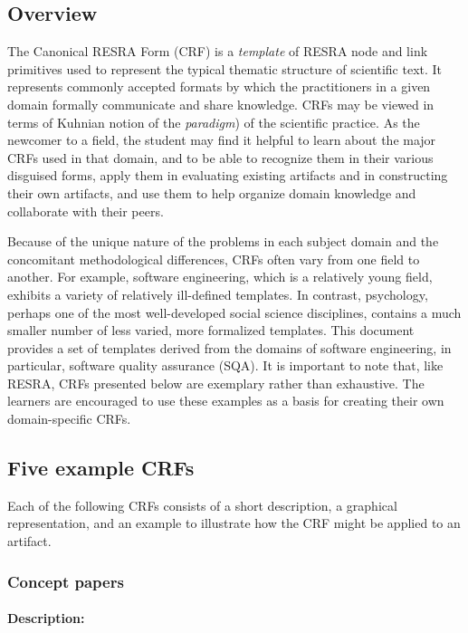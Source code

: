 \begin{itemize}
{\subsection{Overview}

The Canonical RESRA Form (CRF) is a {\it template\/} of RESRA node and link
primitives used to represent the typical thematic structure of scientific
text.  It represents commonly accepted formats by which the practitioners
in a given domain formally communicate and share knowledge. CRFs may be
viewed in terms of Kuhnian notion of the {\it paradigm\/}) of the
scientific practice. As the newcomer to a field, the student may find it
helpful to learn about the major CRFs used in that domain, and to be able
to recognize them in their various disguised forms, apply them in
evaluating existing artifacts and in constructing their own artifacts, and
use them to help organize domain knowledge and collaborate with their
peers.

Because of the unique nature of the problems in each subject domain and the
concomitant methodological differences, CRFs often vary from one field to
another.  For example, software engineering, which is a relatively young
field, exhibits a variety of relatively ill-defined templates.  In
contrast, psychology, perhaps one of the most well-developed social science
disciplines, contains a much smaller number of less varied, more formalized
templates. This document provides a set of templates derived from the
domains of software engineering, in particular, software quality
assurance (SQA). It is important to note that, like RESRA, CRFs presented
below are exemplary rather than exhaustive. The learners are encouraged to
use these examples as a basis for creating their own domain-specific CRFs.


\subsection{Five example CRFs}

Each of the following CRFs consists of a short description, a graphical
representation, and an example to illustrate how the CRF might be applied
to an artifact.


\subsubsection{Concept papers}

\paragraph{Description:}

}
\end{itemize}
